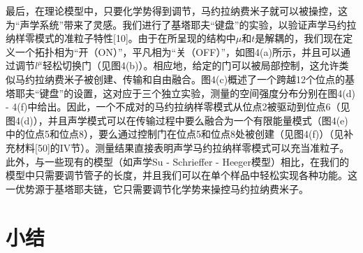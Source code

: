 最后，在理论模型中，只要化学势得到调节，马约拉纳费米子就可以被操控，这为“声学系统”带来了灵感。我们进行了基塔耶夫“键盘”的实验，以验证声学马约拉纳样零模式的准粒子特性[10]。由于在所呈现的结构中\(\mu\)和\(t\)是解耦的，我们现在定义一个拓扑相为“开（ON）”，平凡相为“关（OFF）”，如图4(a)所示，并且可以通过调节\(l^{\mu}\)轻松切换门（见图4(b)）。相应地，给定的门可以被局部控制，这允许类似马约拉纳费米子被创建、传输和自由融合。图4(c)概述了一个跨越12个位点的基塔耶夫“键盘”的设置，这对应于三个独立实验，测量的空间强度分布分别在图4(d) - 4(f)中给出。因此，一个不成对的马约拉纳样零模式从位点2被驱动到位点6（见图4(d)），并且声学模式可以在传输过程中要么融合为一个有限能量模式（图4(e)中的位点5和位点8），要么通过控制门在位点5和位点8处被创建（见图4(f)）（见补充材料[50]的IV节）。测量结果直接表明声学马约拉纳样零模式可以充当准粒子。此外，与一些现有的模型（如声学Su - Schrieffer - Heeger模型）相比，在我们的模型中只需要调节管子的长度，并且我们可以在单个样品中轻松实现各种功能。这一优势源于基塔耶夫链，它只需要调节化学势来操控马约拉纳费米子。

\section{小结}